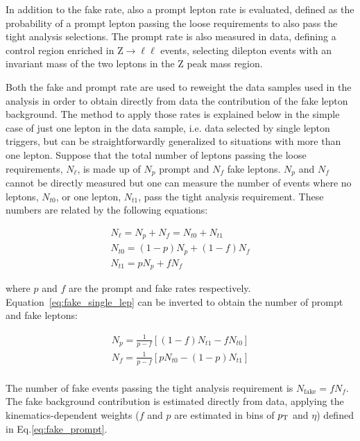 In addition to the fake rate, also a prompt lepton rate is evaluated, defined as the probability of a prompt lepton passing the loose requirements to also pass the tight analysis selections.
The prompt rate is also measured in data, defining a control region enriched in $\mathrm{Z} \to \ell\ell$ events, selecting dilepton events with an invariant mass of the two leptons in the Z peak mass region.

Both the fake and prompt rate are used to reweight the data samples used in the analysis in order to obtain directly from data the contribution of the fake lepton background. The method to apply those rates is explained below in the simple case of just one lepton in the data sample, i.e. data selected by single lepton triggers, but can be straightforwardly generalized to situations with more than one lepton.
Suppose that the total number of leptons passing the loose requirements, $N_\ell$, is made up of $N_p$ prompt and $N_f$ fake leptons. $N_p$ and $N_f$ cannot be directly measured but one can measure the number of events where no leptons, $N_{t0}$, or one lepton, $N_{t1}$, pass the tight analysis requirement. These numbers are related by the following equations:

\begin{equation}\label{eq:fake_single_lep}
\begin{gathered}
    N_\ell = N_p + N_f = N_{t0} + N_{t1}\\
    N_{t0} = (1-p)N_p + (1-f)N_f\\
    N_{t1} = pN_p + fN_f
\end{gathered}
\end{equation}

where $p$ and $f$ are the prompt and fake rates respectively. Equation~\eqref{eq:fake_single_lep} can be inverted to obtain the number of prompt and fake leptons:

\begin{equation}\label{eq:fake_prompt}
\begin{gathered}
    N_p = \frac{1}{p-f}\left[ (1-f)N_{t1} - fN_{t0}  \right]\\
    N_f = \frac{1}{p-f}\left[ pN_{t0} - (1-p)N_{t1}  \right]\\
\end{gathered}
\end{equation}

The number of fake events passing the tight analysis requirement is $N_\mathrm{fake} = f N_f$. The fake background contribution is estimated directly from data, applying the kinematics-dependent weights ($f$ and $p$ are estimated in bins of $p_\mathrm{T}$ and $\eta$) defined in Eq.\eqref{eq:fake_prompt}.

